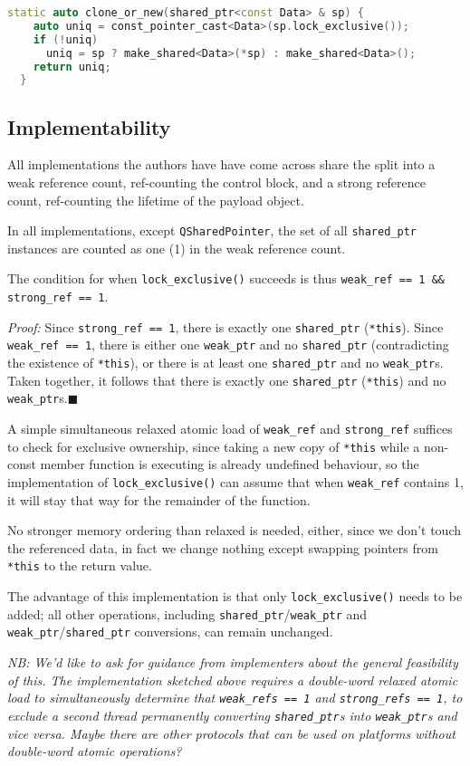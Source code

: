\documentclass[11pt]{article}
\newcommand{\lockx}{\texttt{lock\_exclusive()}}
\newcommand{\wptr}{\texttt{weak\_ptr}}
\newcommand{\sptr}{\texttt{shared\_ptr}}
\begin{document}
\begin{lstlisting}[language=C++,caption={\texttt{clone\_or\_new()} using \lockx}]
  static auto clone_or_new(shared_ptr<const Data> & sp) {
    auto uniq = const_pointer_cast<Data>(sp.lock_exclusive());
    if (!uniq)
      uniq = sp ? make_shared<Data>(*sp) : make_shared<Data>();
    return uniq;
  }
\end{lstlisting}

\subsection{Implementability}

All implementations the authors have have come across share the split
into a weak reference count, ref-counting the control block, and a
strong reference count, ref-counting the lifetime of the payload
object.

In all implementations, except \texttt{QSharedPointer}, the set of all
\sptr{} instances are counted as one (1) in the weak reference count.

The condition for when \lockx{} succeeds is thus \texttt{weak\_ref == 1
  \&\& strong\_ref == 1}.

\textit{Proof:} Since \texttt{strong\_ref == 1}, there is exactly one
\sptr{} (\texttt{*this}). Since \texttt{weak\_ref == 1}, there is
either one \wptr{} and no \sptr{} (contradicting the existence of
\texttt{*this}), or there is at least one \sptr{} and no
\wptr{}s. Taken together, it follows that there is exactly one \sptr{}
(\texttt{*this}) and no \wptr{}s.\hfill$\blacksquare$

A simple simultaneous relaxed atomic load of \texttt{weak\_ref} and
\texttt{strong\_ref} suffices to check for exclusive ownership, since
taking a new copy of \texttt{*this} while a non-const member function
is executing is already undefined behaviour, so the implementation of
\lockx{} can assume that when \texttt{weak\_ref} contains 1, it will
stay that way for the remainder of the function.

No stronger memory ordering than relaxed is needed, either, since we
don't touch the referenced data, in fact we change nothing except
swapping pointers from \texttt{*this} to the return value.

The advantage of this implementation is that only \lockx{} needs to be
added; all other operations, including \sptr/\wptr{} and \wptr/\sptr{}
conversions, can remain unchanged.

\emph{NB: We'd like to ask for guidance from implementers about the
  general feasibility of this. The implementation sketched above
  requires a double-word relaxed atomic load to simultaneously
  determine that \texttt{weak\_refs == 1} and \texttt{strong\_refs ==
    1}, to exclude a second thread permanently converting \sptr{}s
  into \wptr{}s and vice versa. Maybe there are other protocols that
  can be used on platforms without double-word atomic operations?}
\end{document}
